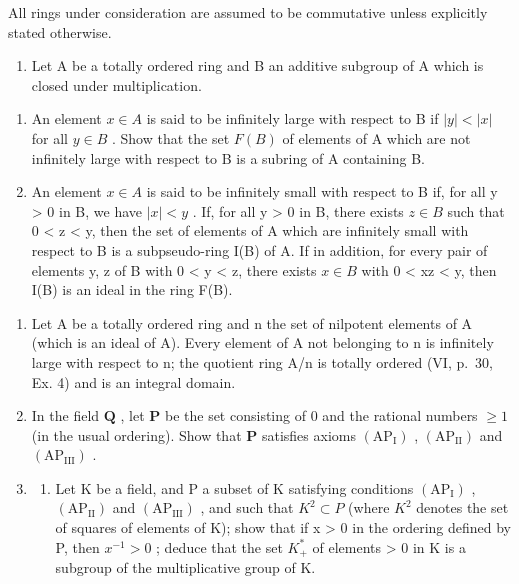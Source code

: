 \BourbakiExerciseGroup

All rings under consideration are assumed to be commutative unless explicitly stated otherwise.

\begin{enumerate}
\def\labelenumi{\arabic{enumi})}
\tightlist
\item
  Let A be a totally ordered ring and B an additive subgroup of A which is closed under multiplication.
\end{enumerate}

\begin{enumerate}
\def\labelenumi{\alph{enumi})}
\item
  An element \(x \in A\) is said to be infinitely large with respect to B if \(|y| < |x|\) for all \(y \in B\) . Show that the set \(F(B)\) of elements of A which are not infinitely large with respect to B is a subring of A containing B.
\item
  An element \(x \in A\) is said to be infinitely small with respect to B if, for all y \textgreater{} 0 in B, we have \(|x| < y\) . If, for all y \textgreater{} 0 in B, there exists \(z \in B\) such that 0 \textless{} z \textless{} y, then the set of elements of A which are infinitely small with respect to B is a subpseudo-ring I(B) of A. If in addition, for every pair of elements y, z of B with 0 \textless{} y \textless{} z, there exists \(x \in B\) with 0 \textless{} xz \textless{} y, then I(B) is an ideal in the ring F(B).
\end{enumerate}

\begin{enumerate}
\def\labelenumi{\arabic{enumi})}
\setcounter{enumi}{1}
\item
  Let A be a totally ordered ring and n the set of nilpotent elements of A (which is an ideal of A). Every element of A not belonging to n is infinitely large with respect to n; the quotient ring A/n is totally ordered (VI, p.~30, Ex. 4) and is an integral domain.
\item
  In the field \(\mathbf{Q}\) , let \(\mathbf{P}\) be the set consisting of 0 and the rational numbers \(\geqslant 1\) (in the usual ordering). Show that \(\mathbf{P}\) satisfies axioms \((\mathrm{AP}_{\mathrm{I}})\) , \((\mathrm{AP}_{\mathrm{II}})\) and \((\mathrm{AP}_{\mathrm{III}})\) .
\item
  \begin{enumerate}
  \def\labelenumii{\alph{enumii})}
  \tightlist
  \item
    Let K be a field, and P a subset of K satisfying conditions \((\mathrm{AP}_{\mathrm{I}})\) , \((\mathrm{AP}_{\mathrm{II}})\) and \((\mathrm{AP}_{\mathrm{III}})\) , and such that \(K^{2} \subset P\) (where \(K^{2}\) denotes the set of squares of elements of K); show that if x \textgreater{} 0 in the ordering defined by P, then \(x^{-1} > 0\) ; deduce that the set \(K_{+}^{*}\) of elements \textgreater{} 0 in K is a subgroup of the multiplicative group of K.
  \end{enumerate}
\end{enumerate}

